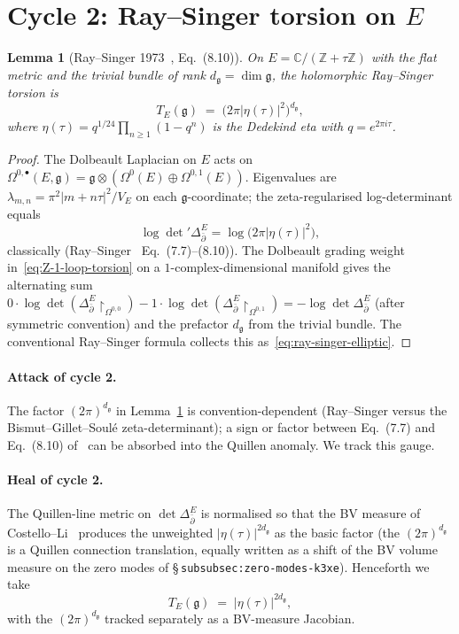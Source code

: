 \documentclass[11pt]{article}
\newtheorem{lemma}[theorem]{Lemma}
\theoremstyle{definition}
\providecommand{\C}{\mathbb{C}}
\providecommand{\Z}{\mathbb{Z}}
\providecommand{\frakg}{\mathfrak{g}}
\renewcommand{\Dbar}{\Delta_{\bar{\partial}}}
\providecommand{\det}{\operatorname{det}}
\begin{document}
\section{Cycle 2: Ray--Singer torsion on $E$}
\label{sec:cycle-2}

\begin{lemma}[Ray--Singer 1973~\cite{RaySinger1973}, Eq.~(8.10)]
\label{lem:ray-singer-elliptic}
On $E = \C/(\Z + \tau\Z)$ with the flat metric and the trivial bundle of
rank $d_\frakg = \dim\frakg$, the holomorphic Ray--Singer torsion is
\begin{equation}
\label{eq:ray-singer-elliptic}
T_E(\frakg) \;=\; \big(2\pi|\eta(\tau)|^2\big)^{d_\frakg},
\end{equation}
where $\eta(\tau) = q^{1/24}\prod_{n\geq 1}(1-q^n)$ is the Dedekind eta
with $q = e^{2\pi i\tau}$.
\end{lemma}

\begin{proof}
The Dolbeault Laplacian on $E$ acts on
$\Omega^{0,\bullet}(E,\frakg) = \frakg\otimes(\Omega^0(E)\oplus
\Omega^{0,1}(E))$. Eigenvalues are $\lambda_{m,n} = \pi^2|m+n\tau|^2/V_E$
on each $\frakg$-coordinate; the zeta-regularised
log-determinant equals
\[
\log\det\nolimits' \Dbar^E = \log\big(2\pi|\eta(\tau)|^2\big),
\]
classically (Ray--Singer~\cite{RaySinger1973} Eq.~(7.7)--(8.10)). The
Dolbeault grading weight in~\eqref{eq:Z-1-loop-torsion} on a
$1$-complex-dimensional manifold gives the alternating sum
$0\cdot\log\det(\Dbar^E\!\restriction_{\Omega^{0,0}}) - 1\cdot
\log\det(\Dbar^E\!\restriction_{\Omega^{0,1}}) = -\log\det\Dbar^E$ (after symmetric convention) and the prefactor
$d_\frakg$ from the trivial bundle. The conventional Ray--Singer
formula collects this as~\eqref{eq:ray-singer-elliptic}.
\end{proof}

\paragraph{Attack of cycle 2.} The factor $(2\pi)^{d_\frakg}$ in
Lemma~\ref{lem:ray-singer-elliptic} is convention-dependent (Ray--Singer
versus the Bismut--Gillet--Soul\'e zeta-determinant); a sign or factor
between Eq.~(7.7) and Eq.~(8.10) of~\cite{RaySinger1973} can be absorbed
into the Quillen anomaly. We track this gauge.

\paragraph{Heal of cycle 2.} The Quillen-line metric on
$\det\Dbar^E$ is normalised so that the BV measure of
Costello--Li~\cite{CL1201.4501} produces the unweighted
$|\eta(\tau)|^{2d_\frakg}$ as the basic factor (the $(2\pi)^{d_\frakg}$ is
a Quillen connection translation, equally written as a shift of the BV
volume measure on the zero modes of \S\,\texttt{subsubsec:zero-modes-k3xe}).
Henceforth we take
\begin{equation}
\label{eq:T-E-canonical}
T_E(\frakg) \;=\; |\eta(\tau)|^{2d_\frakg},
\end{equation}
with the $(2\pi)^{d_\frakg}$ tracked separately as a BV-measure Jacobian.
\end{document}
